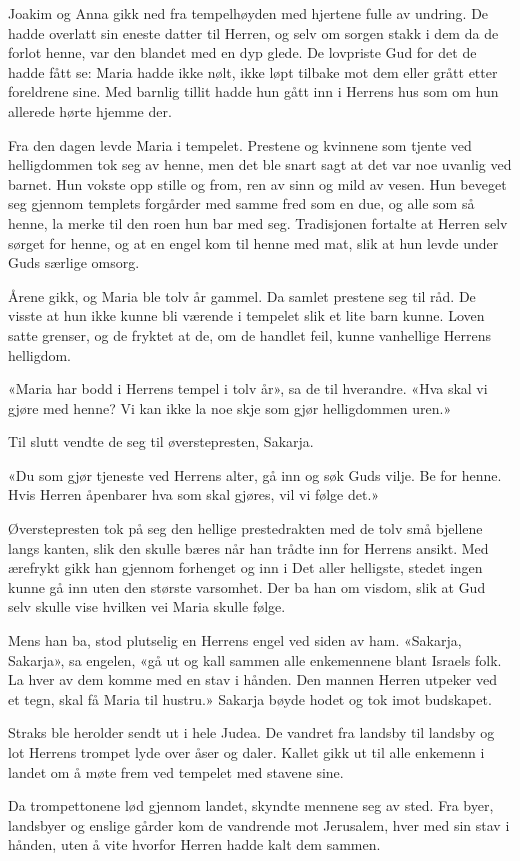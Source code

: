 Joakim og Anna gikk ned fra tempelhøyden med hjertene fulle av undring.
De hadde overlatt sin eneste datter til Herren, og selv om sorgen
stakk i dem da de forlot henne, var den blandet med en dyp glede.
De lovpriste Gud for det de hadde fått se: Maria hadde ikke nølt,
ikke løpt tilbake mot dem eller grått etter foreldrene sine.
Med barnlig tillit hadde hun gått inn i Herrens hus som om hun
allerede hørte hjemme der.

Fra den dagen levde Maria i tempelet. Prestene og kvinnene
som tjente ved helligdommen tok seg av henne, men det ble snart
sagt at det var noe uvanlig ved barnet. Hun vokste opp stille og
from, ren av sinn og mild av vesen. Hun beveget seg gjennom
templets forgårder med samme fred som en due, og alle som så henne,
la merke til den roen hun bar med seg. Tradisjonen fortalte at
Herren selv sørget for henne, og at en engel kom til
henne med mat, slik at hun levde under Guds særlige omsorg.

Årene gikk, og Maria ble tolv år gammel.
Da samlet prestene seg til råd. De visste at hun ikke kunne bli
værende i tempelet slik et lite barn kunne. Loven satte grenser,
og de fryktet at de, om de handlet feil, kunne vanhellige Herrens helligdom.

«Maria har bodd i Herrens tempel i tolv år», sa de til hverandre.
«Hva skal vi gjøre med henne? Vi kan ikke la noe skje som
gjør helligdommen uren.»

Til slutt vendte de seg til øverstepresten, Sakarja.

«Du som gjør tjeneste ved Herrens alter, gå inn og søk Guds vilje.
Be for henne. Hvis Herren åpenbarer hva som skal gjøres, vil vi følge det.»

Øverstepresten tok på seg den hellige prestedrakten med de
tolv små bjellene langs kanten, slik den skulle bæres når han
trådte inn for Herrens ansikt. Med ærefrykt gikk han gjennom
forhenget og inn i Det aller helligste,
stedet ingen kunne gå inn uten den største varsomhet.
Der ba han om visdom, slik at Gud selv skulle
vise hvilken vei Maria skulle følge.

Mens han ba, stod plutselig en Herrens engel ved siden av ham.
«Sakarja, Sakarja», sa engelen,
«gå ut og kall sammen alle enkemennene blant Israels folk.
La hver av dem komme med en stav i hånden.
Den mannen Herren utpeker ved et tegn, skal få Maria til hustru.»
Sakarja bøyde hodet og tok imot budskapet.

Straks ble herolder sendt ut i hele Judea.
De vandret fra landsby til landsby og lot
Herrens trompet lyde over åser og daler.
Kallet gikk ut til alle enkemenn i landet om å møte
frem ved tempelet med stavene sine.

Da trompettonene lød gjennom landet,
skyndte mennene seg av sted. Fra byer, landsbyer og
enslige gårder kom de vandrende mot Jerusalem,
hver med sin stav i hånden, uten å vite hvorfor
Herren hadde kalt dem sammen.



